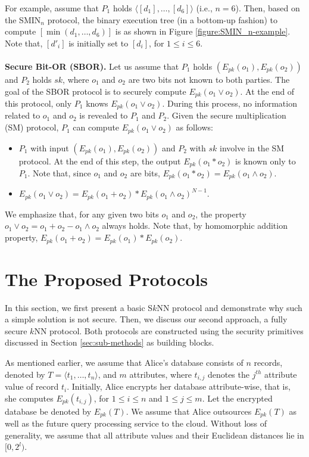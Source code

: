 \documentclass{article}
\begin{document}
For example, assume that $P_1$ holds $\langle [d_1], \ldots, [d_6]\rangle$ (i.e., $n=6$). 
Then, based on the SMIN$_n$ protocol, the binary execution tree (in a bottom-up fashion) 
to compute $[\min(d_1,\ldots, d_6)]$ is as shown in Figure \ref{figure:SMIN_n-example}. Note that, 
$[d'_i]$ is initially set to $[d_i]$, for $1 \le i \le 6$. \\\\
\noindent \textbf{Secure Bit-OR (SBOR). }
Let us assume that $P_1$ holds $(E_{pk}(o_1), E_{pk}(o_2))$ and $P_2$ holds $sk$, where $o_1$ and $o_2$ are 
two bits not known to both parties. The goal of 
the SBOR protocol is to securely compute $E_{pk}(o_1 \vee o_2)$. At the end of this protocol, 
only $P_1$ knows $E_{pk}(o_1 \vee o_2)$. During this process, no information related to $o_1$ and 
$o_2$ is 
revealed to $P_1$ and $P_2$. Given the secure multiplication (SM) protocol, $P_1$ can compute 
$E_{pk}(o_1 \vee o_2)$ as follows:
\begin{itemize}
\item $P_1$ with input $(E_{pk}(o_1), E_{pk}(o_2))$ and $P_2$ with $sk$ involve in the SM protocol. At 
the end of this step, the output $E_{pk}(o_1*o_2)$ is known only to $P_1$. Note that, since 
$o_1$ and $o_2$ are bits, $E_{pk}(o_1*o_2) = E_{pk}(o_1 \wedge o_2)$.
\item $E_{pk}(o_1 \vee o_2) = E_{pk}(o_1 + o_2)\ast E_{pk}(o_1\wedge o_2)^{N-1}$.
\end{itemize} 
We emphasize that, for any given two bits $o_1$ and $o_2$, the property 
$o_1 \vee o_2 = o_1 + o_2 - o_1 \wedge o_2$ always holds. Note that, by 
homomorphic addition property, $E_{pk}(o_1 + o_2) = E_{pk}(o_1)\ast E_{pk}(o_2)$.


\section{The Proposed Protocols}\label{sec:proposed}
In this section, we first present a basic S$k$NN protocol and demonstrate why such a simple 
solution is not secure. Then, we discuss our second approach, a fully secure 
$k$NN protocol. 
Both protocols are constructed using the security 
primitives discussed in Section \ref{sec:sub-methods} as building blocks. 

As mentioned earlier, we assume that Alice's 
database consists of $n$ records, denoted by $T = \langle t_1, \ldots, t_n \rangle$, 
and $m$ attributes, 
where $t_{i,j}$ denotes the $j^{th}$ attribute value of record $t_i$. Initially, Alice 
encrypts her database attribute-wise, that is, 
she computes $E_{pk}(t_{i,j})$, for $1 \le i \le n$ and $1 \le j \le m$. Let the encrypted database be denoted by $E_{pk}(T)$. We assume 
that Alice outsources $E_{pk}(T)$ as well as the future query processing service to the cloud. 
Without loss of generality, we assume that all attribute values and their Euclidean distances lie in $[0, 2^l)$. 
\end{document}
